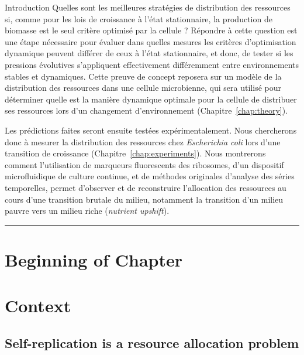 \begin{chapter_summary}{Introduction}
Quelles sont les meilleures stratégies de distribution des ressources si, comme pour les lois de croissance à l'état stationnaire, la production de biomasse est le seul critère optimisé par la cellule ?
Répondre à cette question est une étape nécessaire pour évaluer dans quelles mesures les critères d'optimisation dynamique peuvent différer de ceux à l'état stationnaire, et donc, de tester si les pressions évolutives s'appliquent effectivement différemment entre environnements stables et dynamiques.
Cette preuve de concept reposera sur un modèle de la distribution des ressources dans une cellule microbienne, qui sera utilisé pour déterminer quelle est la manière dynamique optimale pour la cellule de distribuer ses ressources lors d'un changement d'environnement (Chapitre~\ref{chap:theory}).

Les prédictions faites seront ensuite testées expérimentalement.
Nous chercherons donc à mesurer la distribution des ressources chez \textit{Escherichia coli} lors d'une transition de croissance (Chapitre~\ref{chap:experiments}).
Nous montrerons comment l'utilisation de marqueurs fluorescents des ribosomes, d'un dispositif microfluidique de culture continue, et de méthodes originales d'analyse des séries temporelles, permet d'observer et de reconstruire l'allocation des ressources au cours d'une transition brutale du milieu, notamment la transition d'un milieu pauvre vers un milieu riche (\textit{nutrient upshift}).
\end{chapter_summary}

\begin{center}
\noindent\rule{4cm}{0.1pt}
\end{center}

\section*{Beginning of Chapter \thechapter}
\section{Context}
\label{sec:context}

\subsection{Self-replication is a resource allocation problem}

